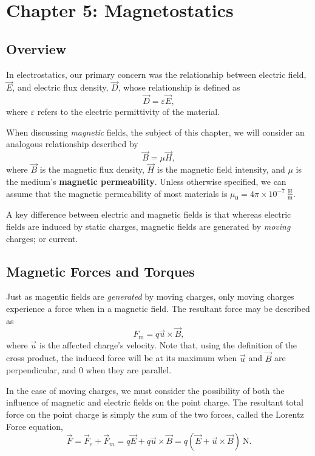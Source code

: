 \documentclass{article}
\begin{document}
\setcounter{section}{4}
\section{Chapter 5: Magnetostatics}
\setcounter{subsection}{-1}
\subsection{Overview}
In electrostatics, our primary concern was the relationship between electric field, \(\vec{E}\), and electric flux density, \(\vec{D}\), whose relationship is defined as
\[
  \vec{D} = \varepsilon \vec{E},
\]
where \(\varepsilon\) refers to the electric permittivity of the material. 

When discussing \textit{magnetic} fields, the subject of this chapter, we will consider an analogous relationship described by 
\[
  \vec{B} = \mu \vec{H},
\]
where \(\vec{B}\) is the magnetic flux density, \(\vec{H}\) is the magnetic field intensity, and \(\mu\) is the medium's \textbf{magnetic permeability}. Unless otherwise specified, we can assume that the magnetic permeability of most materials is \(\mu_0 = 4 \pi \times 10^{-7} \ \mathrm{\frac{H}{m}}\).

A key difference between electric and magnetic fields is that whereas electric fields are induced by static charges, magnetic fields are generated by \textit{moving} charges; or current. 

\subsection{Magnetic Forces and Torques}
Just as magentic fields are \textit{generated} by moving charges, only moving charges experience a force when in a magnetic field. The resultant force may be described as 
\[
	F_{\mathrm{m}} = q \vec{u} \times \vec{B},
\]
	where \(\vec{u}\) is the affected charge's velocity. Note that, using the definition of the cross product, the induced force will be at its maximum when \(\vec{u}\) and \(\vec{B}\) are perpendicular, and \(0\) when they are parallel.

In the case of moving charges, we must consider the possibility of both the influence of magnetic and electric fields on the point charge. The resultant total force on the point charge is simply the sum of the two forces, called the Lorentz Force equation,
\[
	\vec{F} = \vec{F}_e + \vec{F}_m = q \vec{E} + q \vec{u} \times \vec{B} = q(\vec{E}+\vec{u} \times \vec{B}) \ \mathrm{N}.
\]
\end{document}
